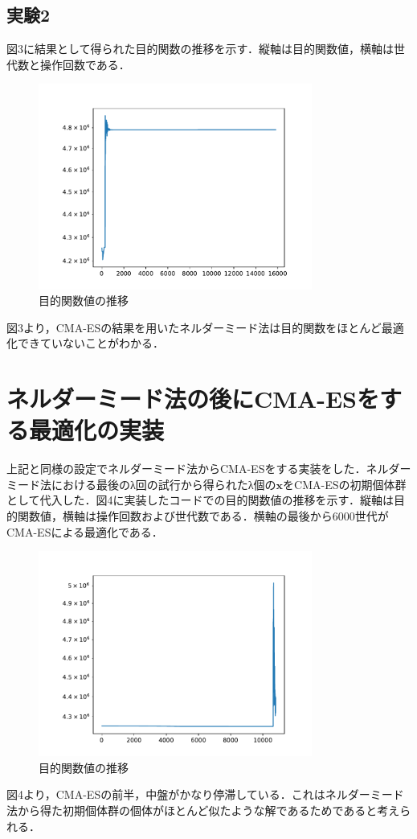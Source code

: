 \documentclass[twocolumn]{jarticle}
\begin{document}
	\subsection{実験2}
		図3に結果として得られた目的関数の推移を示す．縦軸は目的関数値，横軸は世代数と操作回数である．
		\begin{figure}	%
			\centering
            \includegraphics[width=9cm]{cmaes_nelder2.pdf}
            \caption{目的関数値の推移}
        \end{figure}
		図3より，CMA-ESの結果を用いたネルダーミード法は目的関数をほとんど最適化できていないことがわかる．

\section{ネルダーミード法の後にCMA-ESをする最適化の実装}
	上記と同様の設定でネルダーミード法からCMA-ESをする実装をした．ネルダーミード法における最後のλ回の試行から得られたλ個の$\bm{x}$をCMA-ESの初期個体群として代入した．図4に実装したコードでの目的関数値の推移を示す．縦軸は目的関数値，横軸は操作回数および世代数である．横軸の最後から6000世代がCMA-ESによる最適化である．
	\begin{figure}	%
		\centering
		\includegraphics[width=9cm]{nelder_cmaes.pdf}
		\caption{目的関数値の推移}
	\end{figure}
	図4より，CMA-ESの前半，中盤がかなり停滞している．これはネルダーミード法から得た初期個体群の個体がほとんど似たような解であるためであると考えられる．
	
\end{document}
